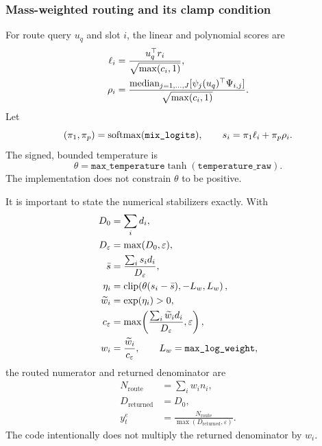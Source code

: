 \subsubsection{Mass-weighted routing and its clamp condition}

For route query \(u_q\) and slot \(i\), the linear and polynomial scores are
\begin{align}
  \ell_i
    &=
    \frac{u_q^\top r_i}{\sqrt{\max(c_i,1)}}, \\
  \rho_i
    &=
    \frac{
      \operatorname{median}_{j=1,\ldots,J}
      [\psi_j(u_q)^\top\Psi_{i,j}]
    }{\sqrt{\max(c_i,1)}}.
  \label{eq:route-component-scores}
\end{align}
Let
\begin{equation}
  (\pi_1,\pi_p)=\operatorname{softmax}(\texttt{mix\_logits}),
  \qquad
  s_i=\pi_1\ell_i+\pi_p\rho_i.
  \label{eq:mixed-route-score}
\end{equation}
The signed, bounded temperature is
\begin{equation}
  \theta
  =
  \texttt{max\_temperature}
  \tanh(\texttt{temperature\_raw}).
  \label{eq:router-temperature}
\end{equation}
The implementation does not constrain \(\theta\) to be positive.

It is important to state the numerical stabilizers exactly.  With
\begin{align}
  D_0&=\sum_i d_i, \\
  D_\varepsilon&=\max(D_0,\varepsilon), \\
  \bar s
    &=\frac{\sum_i s_i d_i}{D_\varepsilon}, \\
  \eta_i
    &=\operatorname{clip}\!\left(
       \theta(s_i-\bar s),-L_w,L_w
      \right), \\
  \widetilde w_i&=\exp(\eta_i)>0, \\
  c_\varepsilon
    &=\max\!\left(
      \frac{\sum_i\widetilde w_i d_i}{D_\varepsilon},
      \varepsilon
    \right), \\
  w_i&=\frac{\widetilde w_i}{c_\varepsilon},
  \qquad
  L_w=\texttt{max\_log\_weight},
  \label{eq:implemented-router}
\end{align}
the routed numerator and returned denominator are
\begin{align}
  N_{\mathrm{route}}
    &=\sum_iw_i n_i, \\
  D_{\mathrm{returned}}
    &=D_0, \\
  y_t^e
    &=\frac{N_{\mathrm{route}}}
            {\max(D_{\mathrm{returned}},\varepsilon)}.
  \label{eq:episodic-output}
\end{align}
The code intentionally does not multiply the returned denominator by \(w_i\).


